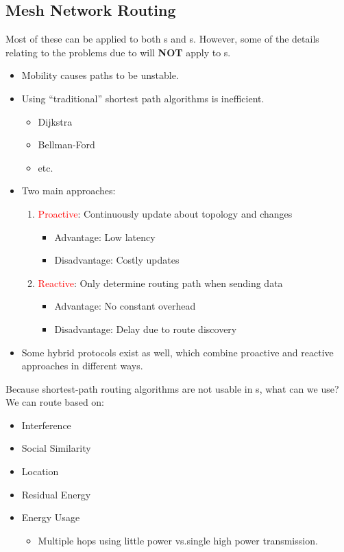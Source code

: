 \subsection{Mesh Network Routing}\label{subsec:Mesh_Network_Routing}
\begin{remark*}
  Most of these can be applied to both s and s.
  However, some of the details relating to the problems due to  will \textbf{NOT} apply to s.
\end{remark*}

\begin{itemize}[noitemsep]
\item Mobility causes paths to be unstable.
\item Using “traditional” shortest path algorithms is inefficient.
  \begin{itemize}[noitemsep]
  \item Dijkstra
  \item Bellman-Ford
  \item etc.
  \end{itemize}

\item Two main approaches:
  \begin{enumerate}[noitemsep]
  \item \textcolor{red}{Proactive}: Continuously update about topology and changes
    \begin{itemize}[noitemsep]
    \item Advantage: Low latency
    \item Disadvantage: Costly updates
    \end{itemize}
  \item \textcolor{red}{Reactive}: Only determine routing path when sending data
    \begin{itemize}[noitemsep]
    \item Advantage: No constant overhead
    \item Disadvantage: Delay due to route discovery
    \end{itemize}
  \end{enumerate}

\item Some hybrid protocols exist as well, which combine proactive
  and reactive approaches in different ways.
\end{itemize}

Because shortest-path routing algorithms are not usable in s, what can we use?
We can route based on:
\begin{itemize}[noitemsep]
\item Interference
\item Social Similarity
\item Location
\item Residual Energy
\item Energy Usage
  \begin{itemize}[noitemsep]
  \item Multiple hops using little power vs.\@ single high power transmission.
  \end{itemize}
\end{itemize}

